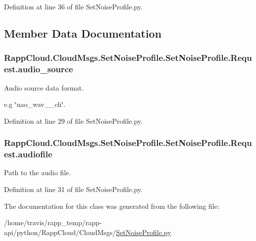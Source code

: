 Definition at line 36 of file Set\-Noise\-Profile.\-py.



\subsection{Member Data Documentation}
\hypertarget{classRappCloud_1_1CloudMsgs_1_1SetNoiseProfile_1_1SetNoiseProfile_1_1Request_ad926ab70a457c02b21b5d5cefc682766}{
\subsubsection[{audio\-\_\-source}]{\setlength{\rightskip}{0pt plus 5cm}Rapp\-Cloud.\-Cloud\-Msgs.\-Set\-Noise\-Profile.\-Set\-Noise\-Profile.\-Request.\-audio\-\_\-source}}\label{classRappCloud_1_1CloudMsgs_1_1SetNoiseProfile_1_1SetNoiseProfile_1_1Request_ad926ab70a457c02b21b5d5cefc682766}


Audio source data format. 

e.\-g \char`\"{}nao\-\_\-wav\-\_\-\_\-ch\char`\"{}. 

Definition at line 29 of file Set\-Noise\-Profile.\-py.

\hypertarget{classRappCloud_1_1CloudMsgs_1_1SetNoiseProfile_1_1SetNoiseProfile_1_1Request_afb321b03e5e5d0a37fa2236a282cb7ab}{
\subsubsection[{audiofile}]{\setlength{\rightskip}{0pt plus 5cm}Rapp\-Cloud.\-Cloud\-Msgs.\-Set\-Noise\-Profile.\-Set\-Noise\-Profile.\-Request.\-audiofile}}\label{classRappCloud_1_1CloudMsgs_1_1SetNoiseProfile_1_1SetNoiseProfile_1_1Request_afb321b03e5e5d0a37fa2236a282cb7ab}


Path to the audio file. 



Definition at line 31 of file Set\-Noise\-Profile.\-py.



The documentation for this class was generated from the following file\-:\begin{DoxyCompactItemize}
\item 
/home/travis/rapp\-\_\-temp/rapp-\/api/python/\-Rapp\-Cloud/\-Cloud\-Msgs/\hyperlink{SetNoiseProfile_8py}{Set\-Noise\-Profile.\-py}\end{DoxyCompactItemize}
